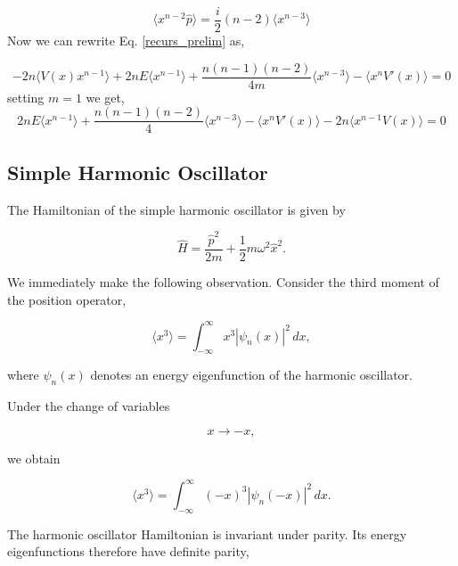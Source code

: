 \documentclass{article}
\theoremstyle{definition}
\begin{document}
\begin{equation}
        \langle x^{n-2}\hat{p}\rangle = \frac{i}{2}(n-2) \langle x^{n-3}\rangle
\end{equation}
Now we can rewrite Eq. \eqref{recurs_prelim} as, 

\begin{equation}\label{recurs_main}
     -2n\langle V(x)x^{n-1} \rangle +2nE\langle x^{n-1}\rangle+ \frac{n(n-1)(n-2)}{4m} \langle x^{n-3}\rangle - \langle x^{n}V'(x)\rangle = 0
\end{equation}
setting $m = 1$ we get,
\begin{equation}\label{recurs_main_massless}
     2nE\langle x^{n-1}\rangle+ \frac{n(n-1)(n-2)}{4} \langle x^{n-3}\rangle - \langle x^{n}V'(x)\rangle -2n\langle x^{n-1} V(x) \rangle = 0
\end{equation}

\subsection{Simple Harmonic Oscillator}

The Hamiltonian of the simple harmonic oscillator is given by

\begin{equation}\label{sho_hamil}
    \hat{H}
    =
    \frac{\hat{p}^{2}}{2m}
    +
    \frac{1}{2}m\omega^{2}\hat{x}^{2}.
\end{equation}

We immediately make the following observation. Consider the third moment of the position operator,

\begin{equation}
    \langle x^{3}\rangle
    =
    \int_{-\infty}^{\infty}
    x^{3}|\psi_n(x)|^{2}\,dx,
\end{equation}

where \(\psi_n(x)\) denotes an energy eigenfunction of the harmonic oscillator.

Under the change of variables

\begin{equation*}
    x\longrightarrow -x,
\end{equation*}

we obtain

\begin{equation}
    \langle x^{3}\rangle
    =
    \int_{-\infty}^{\infty}
    (-x)^{3}|\psi_n(-x)|^{2}\,dx.
\end{equation}

The harmonic oscillator Hamiltonian is invariant under parity. Its energy eigenfunctions therefore have definite parity,
\end{document}
